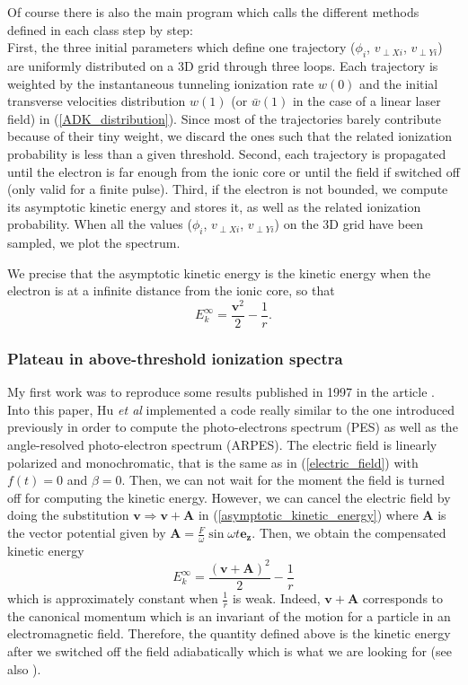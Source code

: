 \documentclass[a4paper]{article}
\begin{document}
Of course there is also the main program which calls the different methods defined in each class step by step: \\
First, the three initial parameters which define one trajectory ($\phi_{i}$, $v_{\perp X i}$, $v_{\perp Y i}$) are uniformly distributed on a 3D grid through three loops. Each trajectory is weighted by the instantaneous tunneling ionization rate $w (0)$ and the initial transverse velocities distribution $w (1)$ (or $\bar w(1)$ in the case of a linear laser field) in (\ref{ADK_distribution}). Since most of the trajectories barely contribute because of their tiny weight, we discard the ones such that the related ionization probability is less than a given threshold.
Second, each trajectory is propagated until the electron is far enough from the ionic core or until the field if switched off (only valid for a finite pulse). 
Third, if the electron is not bounded, we compute its asymptotic kinetic energy and stores it, as well as the related ionization probability.
When all the values ($\phi_{i}$, $v_{\perp X i}$, $v_{\perp Y i}$) on the 3D grid have been sampled, we plot the spectrum.
\par 
We precise that the asymptotic kinetic energy is the kinetic energy when the electron is at a infinite distance from the ionic core, so that
\begin{equation}
\label{asymptotic_kinetic_energy}
E_{k}^{\infty}=\frac{\mathbf{v}^{2}}{2}-\frac{1}{r}.
\end{equation}

\subsubsection{Plateau in above-threshold ionization spectra}

My first work was to reproduce some results published in 1997 in the article \cite{Hu_1997}. Into this paper, Hu \textit{et al} implemented a code really similar to the one introduced previously in order to compute the photo-electrons spectrum (PES) as well as the angle-resolved photo-electron spectrum (ARPES). The electric field is linearly polarized and monochromatic, that is the same as in (\ref{electric_field}) with $f(t)=0$ and $\beta=0$. Then, we can not wait for the moment the field is turned off for computing the kinetic energy. However, we can cancel the electric field by doing the substitution $\mathbf{v}\Rightarrow\mathbf{v}+\mathbf{A}$ in (\ref{asymptotic_kinetic_energy}) where $\mathbf{A}$ is the vector potential given by $\mathbf{A}=\tfrac{F}{\omega}\sin{\omega t}\mathbf{e_{z}}$. Then, we obtain the compensated kinetic energy
\begin{equation}
E_{k}^{\infty}=\frac{(\mathbf{v}+\mathbf{A})^{2}}{2}-\frac{1}{r}
\end{equation}
which is approximately constant when $\frac{1}{r}$ is weak. Indeed, $\mathbf{v}+\mathbf{A}$ corresponds to the canonical momentum which is an invariant of the motion for a particle in an electromagnetic field. Therefore, the quantity defined above is the kinetic energy after we switched off the field adiabatically which is what we are looking for (see also \cite{Leopold_1979}).
\par 
\end{document}
